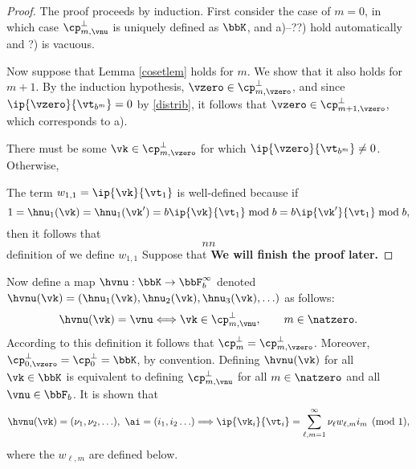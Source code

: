 \documentclass[]{elsarticle}
\theoremstyle{definition}
\begin{document}
\begin{proof} The proof proceeds by induction.  First consider the case of $m=0$, in which case $\cp_{m,\vnu}^{\perp}$ is uniquely defined as $\bbK$, and a)--??) hold automatically and ?) is vacuous. 

Now suppose that Lemma \ref{cosetlem} holds for $m$.  We show that it also holds for $m+1$.  By the induction hypothesis, $\vzero \in \cp_{m,\vzero}^{\perp}$, and since $\ip{\vzero}{\vt_{b^{m}}}=0$ by \eqref{distrib}, it follows that $\vzero \in \cp_{m+1,\vzero}^{\perp}$, which corresponds to a).

There must be some $\vk \in  \cp_{m,\vzero}^{\perp}$ for which $\ip{\vzero}{\vt_{b^{m}}}\ne 0$.  Otherwise,  












The term $w_{1,1} = \ip{\vk}{\vt_{1}}$ is well-defined because if 
\[
1=\hnu_1(\vk)=\hnu_1(\vk')=b \ip{\vk}{\vt_{1}} \bmod b = b \ip{\vk'}{\vt_{1}} \bmod b,
\]
then it follows that 
\[
nn
\]
 definition of  we define $w_{1,1}$ Suppose that 
{\bf We will finish the proof later.}
\end{proof}


Now define a map $\hvnu: \bbK \to \bbF_b^\infty$ denoted $\hvnu(\vk)=(\hnu_1(\vk), \hnu_2(\vk), \hnu_3(\vk), \ldots )$ as follows:
\[
\hvnu(\vk)=\vnu \Longleftrightarrow \vk \in \cp_{m,\vnu}^{\perp}, \qquad m \in \natzero.
\]
According to this definition it follows that $\cp_{m}^{\perp}=\cp_{m,\vzero}^{\perp}$.  Moreover, $\cp_{0,\vzero}^{\perp}=\cp_{0}^{\perp}=\bbK$, by convention.  Defining $\hvnu(\vk)$ for all $\vk \in \bbK$ is equivalent to defining $\cp_{m,\vnu}^{\perp}$ for all $m \in \natzero$ and all $\vnu \in \bbF_b$.  It is shown that
\begin{equation} \label{nuwisum}
\hvnu(\vk)=(\nu_1, \nu_2, \ldots),\  \ai=(i_1, i_2 \ldots) \Longrightarrow \ip{\vk_i}{\vt_i} = \sum_{\ell,m=1}^{\infty} \nu_\ell w_{\ell,m} i_m \pmod 1,
\end{equation}
where the $w_{\ell,m}$ are defined below.  
\end{document}
